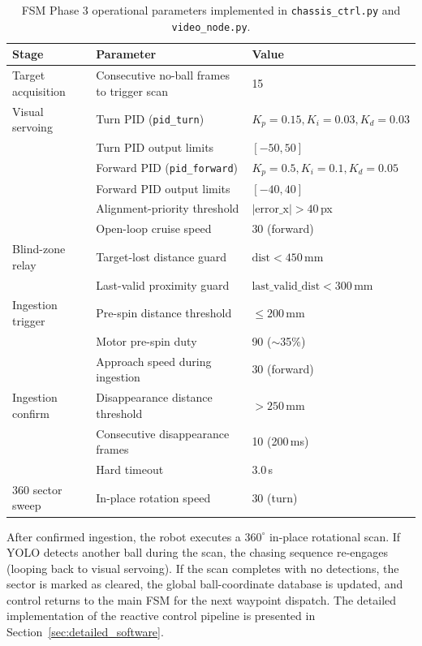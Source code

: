 \begin{table}[!htb]
  \footnotesize
  \centering
  \caption{FSM Phase 3 operational parameters implemented in \texttt{chassis\_ctrl.py} and \texttt{video\_node.py}.}
  \label{tab:fsm_params}
  \begin{tabular}{@{}lll@{}}
    \toprule
    \textbf{Stage} & \textbf{Parameter} & \textbf{Value} \\
    \midrule
    Target acquisition & Consecutive no-ball frames to trigger scan & 15 \\
    Visual servoing & Turn PID (\texttt{pid\_turn}) & $K_p=0.15, K_i=0.03, K_d=0.03$ \\
                       & Turn PID output limits & $[-50, 50]$ \\
                       & Forward PID (\texttt{pid\_forward}) & $K_p=0.5, K_i=0.1, K_d=0.05$ \\
                       & Forward PID output limits & $[-40, 40]$ \\
                       & Alignment-priority threshold & $\lvert\text{error\_x}\rvert > 40$\,px \\
                       & Open-loop cruise speed & 30 (forward) \\
    Blind-zone relay & Target-lost distance guard & $\text{dist} < 450$\,mm \\
                       & Last-valid proximity guard & $\text{last\_valid\_dist} < 300$\,mm \\
    Ingestion trigger & Pre-spin distance threshold & $\leq 200$\,mm \\
                       & Motor pre-spin duty & 90 ($\sim$35\%) \\
                       & Approach speed during ingestion & 30 (forward) \\
    Ingestion confirm & Disappearance distance threshold & $> 250$\,mm \\
                       & Consecutive disappearance frames & 10 (200\,ms) \\
                       & Hard timeout & 3.0\,s \\
    360\textdegree{} sector sweep & In-place rotation speed & 30 (turn) \\
    \bottomrule
  \end{tabular}
\end{table}

After confirmed ingestion, the robot executes a $360^\circ$ in-place rotational scan. If YOLO detects another ball during the scan, the chasing sequence re-engages (looping back to visual servoing). If the scan completes with no detections, the sector is marked as cleared, the global ball-coordinate database is updated, and control returns to the main FSM for the next waypoint dispatch. The detailed implementation of the reactive control pipeline is presented in Section~\ref{sec:detailed_software}.


